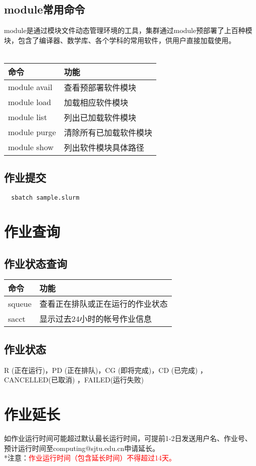 \documentclass[cn, 12pt, hang, black, chinese]{elegantbook}
\begin{document}
\subsection*{module常用命令}
module是通过模块文件动态管理环境的工具，集群通过module预部署了上百种模块，包含了编译器、数学库、各个学科的常用软件，供用户直接加载使用。\\\\
\begin{tabular}{ |l|l| }
 \hline
 命令 & 功能 \\
 \hline \hline
 module avail & 查看预部署软件模块 \\
 \hline
 module load & 加载相应软件模块 \\
 \hline
 module list & 列出已加载软件模块 \\
 \hline
 module purge & 清除所有已加载软件模块 \\
 \hline
 module show & 列出软件模块具体路径 \\
 \hline
\end{tabular}

\subsection*{作业提交}
\begin{lstlisting}
  sbatch sample.slurm
\end{lstlisting}

\section{作业查询}

\subsection*{作业状态查询}
\begin{tabular}{ |l|l| }
 \hline
 命令 & 功能 \\
 \hline \hline
 squeue & 查看正在排队或正在运行的作业状态 \\
 \hline
 sacct & 显示过去24小时的帐号作业信息 \\
 \hline
\end{tabular}

\subsection*{作业状态}
R (正在运行)，PD (正在排队)，CG (即将完成)，CD (已完成) ，CANCELLED(已取消) ，FAILED(运行失败)

\section{作业延长}
如作业运行时间可能超过默认最长运行时间，可提前1-2日发送用户名、作业号、预计运行时间至computing@sjtu.edu.cn申请延长。\\
*注意：\textcolor{red}{作业运行时间（包含延长时间）不得超过14天。}
\end{document}
